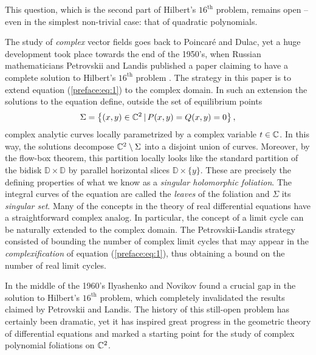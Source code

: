 \documentclass[phd,tocprelim]{cornell}
\begin{document}
\noindent This question, which is the second part of Hilbert's $16^{\text{th}}$ problem, remains open -- even in the simplest non-trivial case: that of quadratic polynomials.

The study of \textit{complex} vector fields goes back to Poincar\'{e} and Dulac, yet a huge development took place towards the end of the 1950's, when Russian mathematicians Petrovskii and Landis published a paper claiming to have a complete solution to Hilbert's $16^{\text{th}}$ problem \cite{PetrovskiiLandis1957}. The strategy in this paper is to extend equation (\ref{preface:eq:1}) to the complex domain. In such an extension the solutions to the equation define, outside the set of equilibrium points
 \[ \Sigma = \left\{{(x,y)\in\mathbb{C}^2}\,\vert\,{P(x,y)=Q(x,y)=0}\right\}, \]
complex analytic curves locally parametrized by a complex variable $t\in\mathbb{C}$. In this way, the solutions decompose $\mathbb{C}^2\setminus\Sigma$ into a disjoint union of curves. Moreover, by the flow-box theorem, this partition locally looks like the standard partition of the bidisk $\mathbb{D}\times\mathbb{D}$ by parallel horizontal slices $\mathbb{D}\times\{y\}$. These are precisely the defining properties of what we know as a \textit{singular holomorphic foliation}. The integral curves of the equation are called the \textit{leaves} of the foliation and $\Sigma$ its \textit{singular set}. Many of the concepts in the theory of real differential equations have a straightforward complex analog. In particular, the concept of a limit cycle can be naturally extended to the complex domain. The Petrovskii-Landis strategy consisted of bounding the number of complex limit cycles that may appear in the \textit{complexification} of equation (\ref{preface:eq:1}), thus obtaining a bound on the number of real limit cycles. 

In the middle of the 1960's Ilyashenko and Novikov found a crucial gap in the solution to Hilbert's $16^{\text{th}}$ problem, which completely invalidated the results claimed by Petrovskii and Landis. The history of this still-open problem has certainly been dramatic, yet it has inspired great progress in the geometric theory of differential equations and marked a starting point for the study of complex polynomial foliations on $\mathbb{C}^2$.
\end{document}
